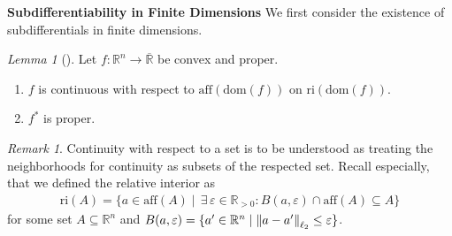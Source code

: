 \documentclass[10pt, leqno]{amsart}
\theoremstyle{definition}
\theoremstyle{remark}
\newtheorem{lemma}[theorem]{Lemma}
\newtheorem{remark}[theorem]{Remark}
\begin{document}
    \phantom{}
    
    \textbf{Subdifferentiability in Finite Dimensions} We first consider the existence of subdifferentials in finite dimensions.

    \begin{lemma}[{\cite[p. 188]{IoffeTihomirov}}] \label{proper_convex_continuity_lemma}
        Let \(f\colon \mathbb{R}^n \to \overline{\mathbb{R}}\) be convex and proper.
        \begin{enumerate}[label=(\roman*), wide]
            \item \label{proper_convex_continuity_lemma_1} \(f\) is continuous with respect to \(\text{aff}({\text{dom}(f)})\) on \(\text{ri}(\text{dom}(f))\).
            \item \label{proper_convex_continuity_lemma_2} \(f^*\) is proper.
        \end{enumerate}
    \end{lemma}

    \begin{remark}
        Continuity with respect to a set is to be understood as treating the neighborhoods for continuity as subsets of the respected set. Recall especially, that we defined the relative interior as \cite[p. 44]{Rockafellar}
        \begin{align}
            \text{ri}(A) = \{a \in \text{aff}(A) \mid \, \exists \, \varepsilon \in \mathbb{R}_{> 0}\colon B(a, \varepsilon) \cap \text{aff}(A) \subseteq A\}
        \end{align}
        for some set \(A \subseteq \mathbb{R}^n\) and \(B(a, \varepsilon) = \{a' \in \mathbb{R}^n \mid \norm{a-a'}_{\ell_2} \leq \varepsilon\}\).
    \end{remark}
\end{document}
